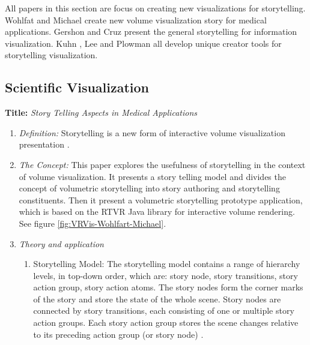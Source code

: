 \documentclass{egpubl}
\begin{document}
All papers in this section are focus on creating new visualizations for storytelling. Wohlfat and Michael \cite{wohlfat} create new volume visualization story for medical applications. Gershon \cite{Gershon2} and Cruz \cite{cruz2011} present the general storytelling for information visualization. Kuhn \cite{kuhn2012}, Lee \cite{lee2013} and Plowman \cite{plowman1999} all develop unique creator tools for storytelling visualization. 


\subsection{Scientific Visualization}
\textbf{Title:} \textit{Story Telling Aspects in Medical Applications}
\begin{enumerate}
\item \textit{Definition:} Storytelling is a new form of interactive volume visualization presentation \cite{wohlfat}.
\item \textit{The Concept:} This paper explores the usefulness of storytelling in the context of volume visualization. It presents a story telling model and divides the concept of volumetric storytelling into story authoring and storytelling constituents. Then it present a volumetric storytelling prototype application, which is based on the RTVR Java library for interactive volume rendering. See figure \ref{fig:VRVis-Wohlfart-Michael}\cite{wohlfat}.
\item \textit{Theory and application}
\begin{enumerate}
\item Storytelling Model: The storytelling model contains a range of hierarchy levels, in top-down order, which are: story node, story transitions, story action group, story action atoms. The story nodes form the corner marks of the story and store the state of the whole scene. Story nodes are connected by story transitions, each consisting of one or multiple story action groups. Each story action group stores the scene changes relative to its preceding action group (or story node) \cite{wohlfat}.


\end{enumerate}
\end{enumerate}
\end{document}
